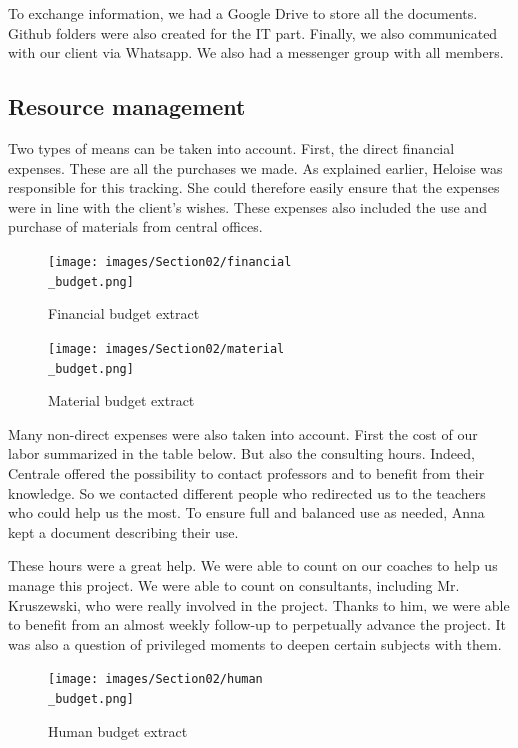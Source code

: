 \bigbreak
To exchange information, we had a Google Drive to store all the documents. Github folders were also created for the IT part. Finally, we also communicated with our client via Whatsapp. We also had a messenger group with all members. 

\subsection{Resource management}

\hspace{\parindent} Two types of means can be taken into account. First, the direct financial expenses. These are all the purchases we made. As explained earlier, Heloise was responsible for this tracking. She could therefore easily ensure that the expenses were in line with the client's wishes. These expenses also included the use and purchase of materials from central offices. 

\begin{figure}[ht]
    \centering
    \texttt{[image: images/Section02/financial\\\_budget.png]}
    \caption{Financial budget extract}
    \label{fig:mesh7}
\end{figure}

\begin{figure}[ht]
    \centering
    \texttt{[image: images/Section02/material\\\_budget.png]}
    \caption{Material budget extract}
    \label{fig:mesh8}
\end{figure}

Many non-direct expenses were also taken into account. First the cost of our labor summarized in the table below. But also the consulting hours. Indeed, Centrale offered the possibility to contact professors and to benefit from their knowledge. So we contacted different people who redirected us to the teachers who could help us the most. To ensure full and balanced use as needed, Anna kept a document describing their use. 

\bigbreak
These hours were a great help. We were able to count on our coaches to help us manage this project. We were able to count on consultants, including Mr. Kruszewski, who were really involved in the project. Thanks to him, we were able to benefit from an almost weekly follow-up to perpetually advance the project. It was also a question of privileged moments to deepen certain subjects with them.

\begin{figure}[ht]
    \centering
    \texttt{[image: images/Section02/human\\\_budget.png]}
    \caption{Human budget extract}
    \label{fig:mesh9}
\end{figure}